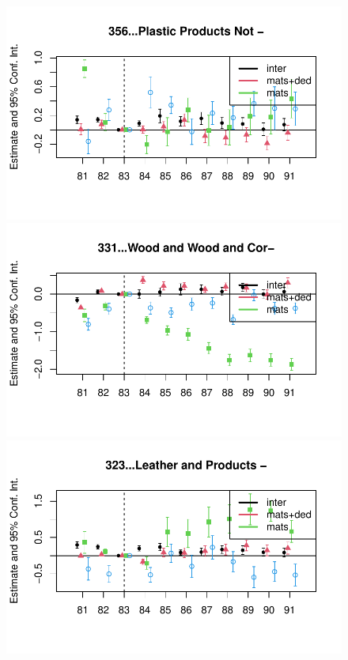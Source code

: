 \documentclass[
  12pt]{article}
\theoremstyle{definition}
\theoremstyle{remark}
\begin{document}
\begin{figure}
\begin{minipage}{\linewidth}
\includegraphics{Tax-Prod_files/figure-pdf/unnamed-chunk-11-16.pdf}

\includegraphics{Tax-Prod_files/figure-pdf/unnamed-chunk-11-17.pdf}

\includegraphics{Tax-Prod_files/figure-pdf/unnamed-chunk-11-18.pdf}

\end{minipage}%

\end{figure}%
\end{document}
